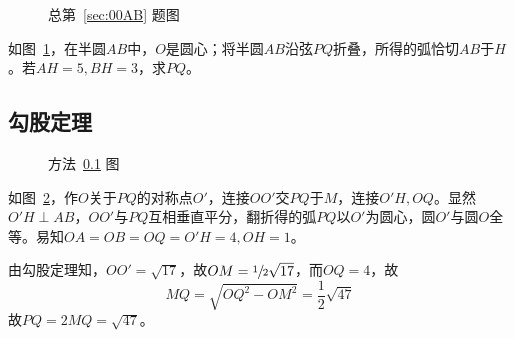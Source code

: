 

\begin{figure}[htbp]
  \centering {}
  \caption{总第~\ref{sec:00AB} 题图} \label{fig:00AB}
\end{figure}

如图~\ref{fig:00AB}，在半圆$AB$中，$O$是圆心；将半圆$AB$沿弦$PQ$折叠，所得的弧恰切$AB$于$H$。若$AH = 5, BH = 3$，求$PQ$。


\subsection{勾股定理} \label{subsec:00AB-sym}

\begin{figure}[htbp]
  \centering {}
  \caption{方法~\ref{subsec:00AB-sym} 图} \label{fig:00AB-sym}
\end{figure}

如图~\ref{fig:00AB-sym}，作$O$关于$PQ$的对称点$O'$，连接$OO'$交$PQ$于$M$，连接$O'H, OQ$。显然$O'H \perp AB$，$OO'$与$PQ$互相垂直平分，翻折得的弧$PQ$以$O'$为圆心，圆$O'$与圆$O$全等。易知$OA = OB = OQ = O'H = 4, OH = 1$。

由勾股定理知，$OO' = \sqrt{17}$，故$OM = \sfrac12\sqrt{17}$，而$OQ = 4$，故
\[ MQ = \sqrt{OQ^2 - OM^2} = \frac12\sqrt{47} \]
故$PQ = 2MQ = \sqrt{47}$。
